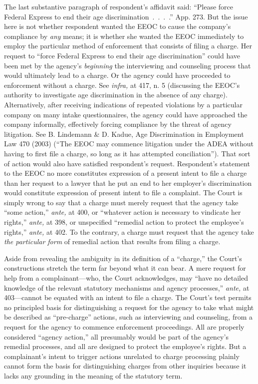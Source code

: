   The last substantive paragraph of respondent's affidavit
said: ``Please force Federal Express to end their age
discrimination~.~.~.~.'' App. 273. But the issue here is not
whether respondent wanted the EEOC to cause the com\newpage pany's
compliance by \emph{any} means; it is whether she wanted the EEOC
immediately to employ the particular method of enforcement that consists
of filing a charge. Her request to ``force Federal Express to end
their age discrimination'' could have been met by the agency's
\emph{beginning} the interviewing and counseling process that would
ultimately lead to a charge. Or the agency could have proceeded to
enforcement without a charge. See \emph{infra,} at 417, n. 5 (discussing
the EEOC's authority to investigate age discrimination in the absence
of any charge). Alternatively, after receiving indications of repeated
violations by a particular company on many intake questionnaires, the
agency could have approached the company informally, effectively forcing
compliance by the threat of agency litigation. See B. Lindemann \& D.
Kadue, Age Discrimination in Employment Law 470 (2003) (``The EEOC
may commence litigation under the ADEA without having to first file a
charge, so long as it has attempted conciliation''). That sort of
action would also have satisfied respondent's request. Respondent's
statement to the EEOC no more constitutes expression of a present intent
to file a charge than her request to a lawyer that he put an end to
her employer's discrimination would constitute expression of present
intent to file a complaint. The Court is simply wrong to say that a
charge must merely request that the agency take ``some action,''
\emph{ante,} at 400, or ``whatever action is necessary to vindicate
her rights,'' \emph{ante,} at 398, or unspecified ``remedial action
to protect the employee's rights,'' \emph{ante,} at 402. To the
contrary, a charge must request that the agency take \emph{the particular
form} of remedial action that results from filing a charge.

  Aside from revealing the ambiguity in its definition of a
``charge,'' the Court's constructions stretch the term far beyond
what it can bear. A mere request for help from a complainant---who,
the Court acknowledges, may ``have no detailed knowledge of the
relevant statutory mechanisms and agency processes,'' \emph{ante,} at
403---cannot be equated with \newpage  an intent to file a charge. The
Court's test permits no principled basis for distinguishing a request
for the agency to take what might be described as ``pre-charge''
actions, such as interviewing and counseling, from a request for the
agency to commence enforcement proceedings. All are properly considered
``agency action,'' all presumably would be part of the agency's
remedial processes, and all are designed to protect the employee's
rights. But a complainant's intent to trigger actions unrelated to
charge processing plainly cannot form the basis for distinguishing
charges from other inquiries because it lacks any grounding in the
meaning of the statutory term.

